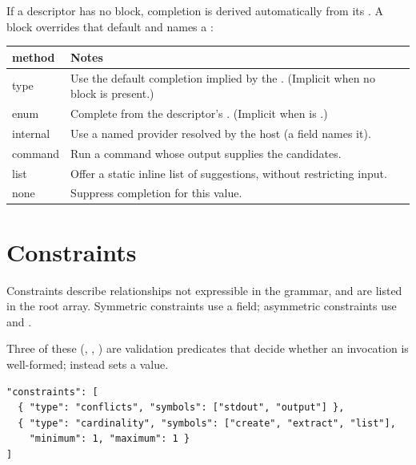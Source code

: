 If a descriptor has no  block, completion is derived automatically from its . A block overrides that default and names a :

\begin{tabulary}{\textwidth}{lL}
method & Notes \\
\hline
type     & Use the default completion implied by the . (Implicit when no block is present.) \\
enum     & Complete from the descriptor's . (Implicit when  is .) \\
internal & Use a named provider resolved by the host (a  field names it). \\
command  & Run a command whose output supplies the candidates. \\
list     & Offer a static inline list of suggestions, without restricting input. \\
none     & Suppress completion for this value. \\
\end{tabulary}

\section{Constraints}

Constraints describe relationships not expressible in the grammar, and are listed in the root  array. Symmetric constraints use a  field; asymmetric constraints use  and .

\begin{outline}
\1
\1
\1
\1
\end{outline}

Three of these (, , ) are validation predicates that decide whether an invocation is well-formed;  instead sets a value.

\begin{lstlisting}
"constraints": [
  { "type": "conflicts", "symbols": ["stdout", "output"] },
  { "type": "cardinality", "symbols": ["create", "extract", "list"],
    "minimum": 1, "maximum": 1 }
]
\end{lstlisting}

